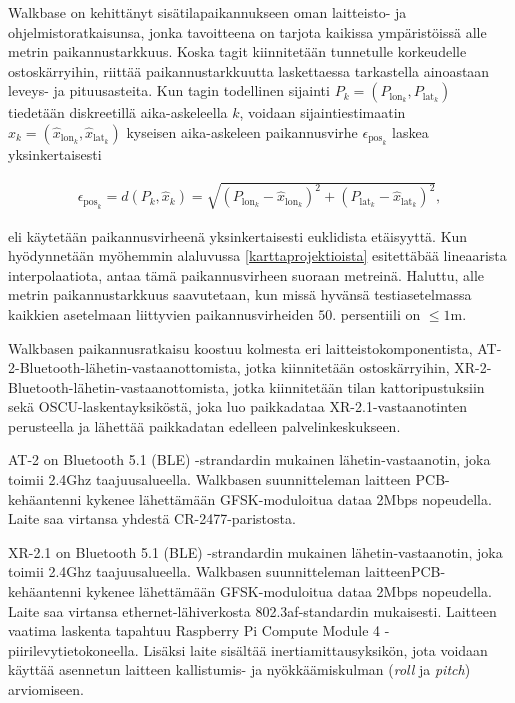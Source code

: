 \documentclass[
  12pt,
  a4paper, twoside]{book}
\begin{document}
Walkbase on kehittänyt sisätilapaikannukseen oman laitteisto- ja ohjelmistoratkaisunsa, jonka tavoitteena on tarjota kaikissa ympäristöissä alle metrin paikannustarkkuus. Koska tagit kiinnitetään tunnetulle korkeudelle ostoskärryihin, riittää paikannustarkkuutta laskettaessa tarkastella ainoastaan leveys- ja pituusasteita. Kun tagin todellinen sijainti \(P_k=(P_{\text{lon}_k}, P_{\text{lat}_k})\) tiedetään diskreetillä aika-askeleella \(k\), voidaan sijaintiestimaatin \(\hat{x}_k=(\hat{x}_{\text{lon}_k}, \hat{x}_{\text{lat}_k})\) kyseisen aika-askeleen paikannusvirhe \(\epsilon_{\text{pos}_k}\) laskea yksinkertaisesti

\begin{align}\label{paikannusvirhe}
\epsilon_{\text{pos}_k} = d(P_k,\hat{x}_k) = \sqrt{(P_{\text{lon}_k}-\hat{x}_{\text{lon}_k})^2+(P_{\text{lat}_k}-\hat{x}_{\text{lat}_k})^2}
,\end{align}

eli käytetään paikannusvirheenä yksinkertaisesti euklidista etäisyyttä. Kun hyödynnetään myöhemmin alaluvussa \ref{karttaprojektioista} esitettäbää lineaarista interpolaatiota, antaa tämä paikannusvirheen suoraan metreinä. Haluttu, alle metrin paikannustarkkuus saavutetaan, kun missä hyvänsä testiasetelmassa kaikkien asetelmaan liittyvien paikannusvirheiden \(50.\) persentiili on \(\leq1\)m.

Walkbasen paikannusratkaisu koostuu kolmesta eri laitteistokomponentista, AT-2-Bluetooth-lähetin-vastaanottomista, jotka kiinnitetään ostoskärryihin, XR-2-Bluetooth-lähetin-vastaanottomista, jotka kiinnitetään tilan kattoripustuksiin sekä OSCU-laskentayksiköstä, joka luo paikkadataa XR-2.1-vastaanotinten perusteella ja lähettää paikkadatan edelleen palvelinkeskukseen.

AT-2 on Bluetooth 5.1 (BLE) -strandardin mukainen lähetin-vastaanotin, joka toimii 2.4Ghz taajuusalueella. Walkbasen suunnitteleman laitteen PCB-kehäantenni kykenee lähettämään GFSK-moduloitua dataa 2Mbps nopeudella. Laite saa virtansa yhdestä CR-2477-paristosta.

XR-2.1 on Bluetooth 5.1 (BLE) -strandardin mukainen lähetin-vastaanotin, joka toimii 2.4Ghz taajuusalueella. Walkbasen suunnitteleman laitteenPCB-kehäantenni kykenee lähettämään GFSK-moduloitua dataa 2Mbps nopeudella. Laite saa virtansa ethernet-lähiverkosta 802.3af-standardin mukaisesti. Laitteen vaatima laskenta tapahtuu Raspberry Pi Compute Module 4 -piirilevytietokoneella. Lisäksi laite sisältää inertiamittausyksikön, jota voidaan käyttää asennetun laitteen kallistumis- ja nyökkäämiskulman (\emph{roll} ja \emph{pitch}) arviomiseen.
\end{document}

